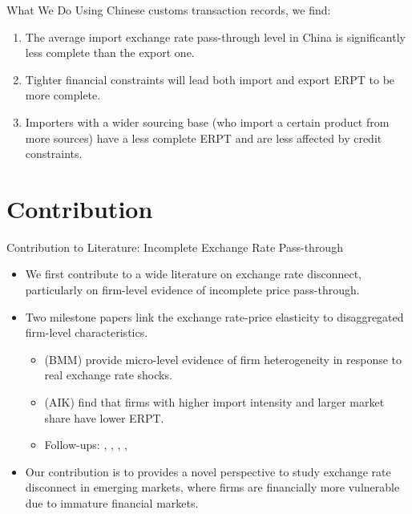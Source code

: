 \documentclass[10pt]{beamer}
\begin{document}
\begin{frame}{What We Do}
Using Chinese customs transaction records, we find:	
	\begin{enumerate}
		\item The average import exchange rate pass-through level in China is significantly less complete than the export one.
		\item Tighter financial constraints will lead both import and export ERPT to be more complete.
		\item Importers with a wider sourcing base (who import a certain product from more sources) have a less complete ERPT and are less affected by credit constraints.
	\end{enumerate}	
\end{frame}

\section{Contribution}

\begin{frame}{Contribution to Literature: Incomplete Exchange Rate Pass-through}
	\begin{itemize}
		\item We first contribute to a wide literature on exchange rate disconnect, particularly on firm-level evidence of incomplete price pass-through.
		\item Two milestone papers link the exchange rate-price elasticity to
		disaggregated firm-level characteristics.
		\begin{itemize}
			\item \cite{bmm2012} (BMM) provide micro-level evidence of firm heterogeneity in response to real exchange rate shocks.
			\item \cite{aik2014} (AIK) find that
			firms with higher import intensity and larger market share have lower ERPT.
			\item Follow-ups: \cite{lmx2015}, \cite{chen2016}, \cite{garetto2016}, \cite{auer2016}, \cite{devereux2017}
		\end{itemize}
		\item Our contribution is to provides a novel perspective to study exchange rate disconnect in emerging markets, where firms are financially more vulnerable due to immature financial markets.
	\end{itemize}
\end{frame}
\end{document}
